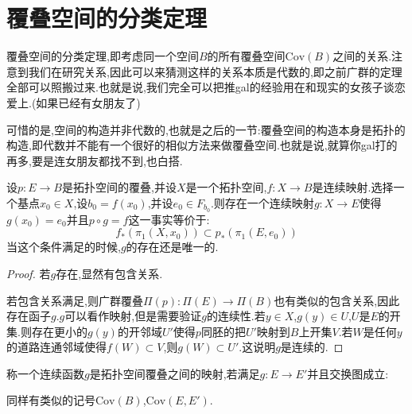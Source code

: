 \section{覆叠空间的分类定理}
覆叠空间的分类定理,即考虑同一个空间$B$的所有覆叠空间$\mathrm{Cov}(B)$之间的关系.注意到我们在研究关系,因此可以来猜测这样的关系本质是代数的,即之前广群的定理全部可以照搬过来.也就是说,我们完全可以把推gal的经验用在和现实的女孩子谈恋爱上.(如果已经有女朋友了)

可惜的是,空间的构造并非代数的,也就是之后的一节:覆叠空间的构造本身是拓扑的构造,即代数并不能有一个很好的相似方法来做覆叠空间.也就是说,就算你gal打的再多,要是连女朋友都找不到,也白搭.
\begin{theorem}
    设$p:E\to B$是拓扑空间的覆叠,并设$X$是一个拓扑空间,$f:X\to B$是连续映射.选择一个基点$x_0\in X$,设$b_0=f(x_0)$,并设$e_0\in F_{b_0}$.则存在一个连续映射$g:X\to E$使得$g(x_0)=e_0$并且$p\circ g=f$这一事实等价于:
    $$
    f_*(\pi_1(X,x_0))\subset p_*(\pi_1(E,e_0))
    $$
    当这个条件满足的时候,$g$的存在还是唯一的.
    
\end{theorem}
\begin{proof}
    若$g$存在,显然有包含关系.

    若包含关系满足,则广群覆叠$\Pi(p):\Pi(E)\to \Pi(B)$也有类似的包含关系,因此存在函子$g$.$g$可以看作映射,但是需要验证$g$的连续性.若$y \in X$,$g(y) \in U$,$U$是$E$的开集.则存在更小的$g(y)$的开邻域$U'$使得$p$同胚的把$U'$映射到$B$上开集$V$.若$W$是任何$y$的道路连通邻域使得$f(W)\subset V$,则$g(W)\subset U'$.这说明$g$是连续的.
\end{proof}
\begin{definition}
    称一个连续函数$g$是拓扑空间覆叠之间的映射,若满足$g:E\to E'$并且交换图成立:
\end{definition}
同样有类似的记号$\mathrm{Cov}(B)$,$\mathrm{Cov}(E,E')$.

